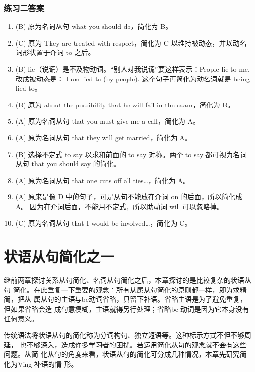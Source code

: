 \subsection{练习二答案}
\begin{enumerate}
\item (B) 原为名词从句 what you should do，简化为 B。

\item (C) 原为 They are treated with respect，简化为 C 以维持被动态，并以动名词形状置于介词 to 之后。
\item (B) lie（说谎）是不及物动词。“别人对我说谎”要这样表示：People lie to me. 改成被动态是： I am lied to (by people). 这个句子再简化为动名词就是 being lied to。

\item (B) 原为 about the possibility that he will fail in the exam，简化为 B。

\item (A) 原为名词从句 that you must give me a call，简化为 A。

\item (A) 原为名词从句 that they will get married，简化为 A。

\item (B) 选择不定式 to say 以求和前面的 to say 对称。两个 to say 都可视为名词从句 that you should say 的简化。

\item (A) 原为名词从句 that one cuts off all ties…，简化为 A。

\item (A) 原来是像 D 中的句子，可是从句不能放在介词 on 的后面，所以简化成 A。
  因为在介词后面，不能用不定式，所以助动词 will 可以忽略掉。

\item (C) 原为名词从句 that I would be involved…，简化为 C。
\end{enumerate}

\chapter{状语从句简化之一}

继前两章探讨关系从句简化、名词从句简化之后，本章探讨的是比较复杂的状语从句
简化。在此重复一下重要的观念：所有从属从句简化的原则都一样，即为求精简，把从
属从句的主语与be动词省略，只留下补语。省略主语是为了避免重复，但如果省略会造
成句意模糊，主语就得另行处理；省略be 动词是因为它本身没有任何意义。

传统语法将状语从句的简化称为分词构句、独立短语等。这种标示方式不但不够周延，
也不够深入，造成许多学习者的困扰。若运用简化从句的观念就不会有这些问题。从简
化从句的角度来看，状语从句的简化可分成几种情况，本章先研究简化为Ving 补语的情
形。

